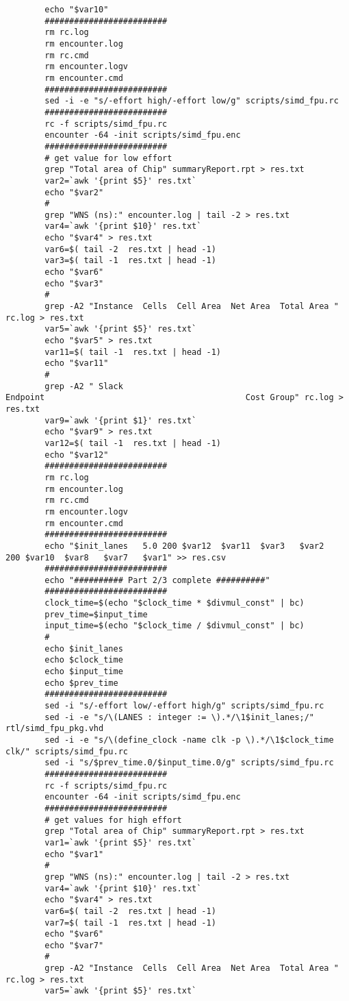 \documentclass[conference]{IEEEtran}
\begin{document}
\begin{lstlisting}
		echo "$var10"
		#########################
		rm rc.log
		rm encounter.log
		rm rc.cmd
		rm encounter.logv
		rm encounter.cmd
		#########################
		sed -i -e "s/-effort high/-effort low/g" scripts/simd_fpu.rc
		#########################
		rc -f scripts/simd_fpu.rc
		encounter -64 -init scripts/simd_fpu.enc
		#########################
		# get value for low effort
		grep "Total area of Chip" summaryReport.rpt > res.txt
		var2=`awk '{print $5}' res.txt`
		echo "$var2"
		#
		grep "WNS (ns):" encounter.log | tail -2 > res.txt
		var4=`awk '{print $10}' res.txt`
		echo "$var4" > res.txt
		var6=$( tail -2  res.txt | head -1)
		var3=$( tail -1  res.txt | head -1)
		echo "$var6"
		echo "$var3"
		#
		grep -A2 "Instance  Cells  Cell Area  Net Area  Total Area " rc.log > res.txt
		var5=`awk '{print $5}' res.txt`
		echo "$var5" > res.txt
		var11=$( tail -1  res.txt | head -1)
		echo "$var11"
		#
		grep -A2 " Slack                                          Endpoint                                         Cost Group" rc.log > res.txt
		var9=`awk '{print $1}' res.txt`
		echo "$var9" > res.txt
		var12=$( tail -1  res.txt | head -1)
		echo "$var12"	
		#########################
		rm rc.log
		rm encounter.log
		rm rc.cmd
		rm encounter.logv
		rm encounter.cmd
		#########################
		echo "$init_lanes	5.0	200	$var12	$var11	$var3	$var2	200	$var10	$var8	$var7	$var1" >> res.csv
		#########################
		echo "########## Part 2/3 complete ##########"
		#########################
		clock_time=$(echo "$clock_time * $divmul_const" | bc)
		prev_time=$input_time
		input_time=$(echo "$clock_time / $divmul_const" | bc)
		#
		echo $init_lanes
		echo $clock_time
		echo $input_time
		echo $prev_time
		#########################
		sed -i "s/-effort low/-effort high/g" scripts/simd_fpu.rc
		sed -i -e "s/\(LANES : integer := \).*/\1$init_lanes;/" rtl/simd_fpu_pkg.vhd
		sed -i -e "s/\(define_clock -name clk -p \).*/\1$clock_time clk/" scripts/simd_fpu.rc
		sed -i "s/$prev_time.0/$input_time.0/g" scripts/simd_fpu.rc
		#########################
		rc -f scripts/simd_fpu.rc
		encounter -64 -init scripts/simd_fpu.enc
		#########################
		# get values for high effort
		grep "Total area of Chip" summaryReport.rpt > res.txt
		var1=`awk '{print $5}' res.txt`
		echo "$var1"
		#
		grep "WNS (ns):" encounter.log | tail -2 > res.txt
		var4=`awk '{print $10}' res.txt`
		echo "$var4" > res.txt
		var6=$( tail -2  res.txt | head -1)
		var7=$( tail -1  res.txt | head -1)
		echo "$var6"
		echo "$var7"
		#
		grep -A2 "Instance  Cells  Cell Area  Net Area  Total Area " rc.log > res.txt
		var5=`awk '{print $5}' res.txt`

\end{lstlisting}
\end{document}
